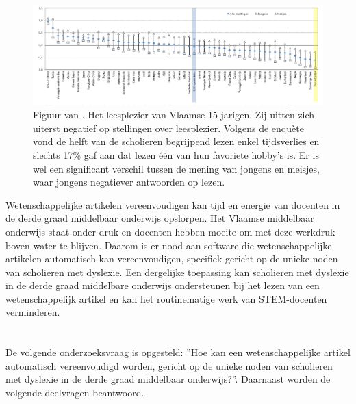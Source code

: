 \begin{figure}[H]
	\begin{center}
		\includegraphics[width=\linewidth]{img/oeso-graphic-leesplezier.png}
	\end{center}
	\caption{Figuur van \textcite{DeMeyer2019}. Het leesplezier van Vlaamse 15-jarigen. Zij uitten zich uiterst negatief op stellingen over leesplezier. Volgens de enquète vond de helft van de scholieren begrijpend lezen enkel tijdsverlies en slechts 17\% gaf aan dat lezen één van hun favoriete hobby's is. Er is wel een significant verschil tussen de mening van jongens en meisjes, waar jongens negatiever antwoorden op lezen.}
\end{figure}

Wetenschappelijke artikelen vereenvoudigen kan tijd en energie van docenten in de derde graad middelbaar onderwijs opslorpen. Het Vlaamse middelbaar onderwijs staat onder druk en docenten hebben moeite om met deze werkdruk boven water te blijven. Daarom is er nood aan software die wetenschappelijke artikelen automatisch kan vereenvoudigen, specifiek gericht op de unieke noden van scholieren met dyslexie. Een dergelijke toepassing kan scholieren met dyslexie in de derde graad middelbare onderwijs ondersteunen bij het lezen van een wetenschappelijk artikel en kan het routinematige werk van STEM-docenten verminderen. 

\section{}%
\label{sec:onderzoeksvraag}

De volgende onderzoeksvraag is opgesteld: ”Hoe kan een wetenschappelijke artikel automatisch vereenvoudigd worden, gericht op de unieke noden van scholieren met dyslexie in de derde graad middelbaar onderwijs?”. Daarnaast worden de volgende deelvragen beantwoord.

